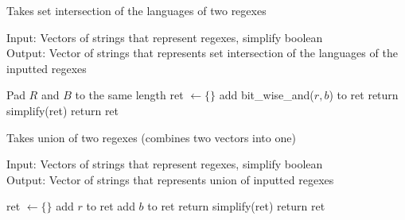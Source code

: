 \documentclass[runningheads]{llncs}
\begin{document}
\begin{algorithm}[H]
\caption{Takes set intersection of the languages of two regexes}
Input: Vectors of strings that represent regexes, simplify boolean\\
Output: Vector of strings that represents set intersection of the languages of the inputted regexes
\begin{algorithmic}

    \State Pad $R$ and $B$ to the same length
    \State ret $\leftarrow \{\}$ 
         
            \State add bit\_wise\_and($r, b$) to ret 
        \EndFor
    \EndFor
    \State return simplify(ret) 
    \Else
    \State return ret
    \EndIf
\EndProcedure

\end{algorithmic}
\end{algorithm}


\begin{algorithm}[H]
\caption{Takes union of two regexes (combines two vectors into one)}
Input: Vectors of strings that represent regexes, simplify boolean\\
Output: Vector of strings that represents union of inputted regexes
\begin{algorithmic}

    \State ret $\leftarrow \{\}$ 
        \State add $r$ to ret 
    \EndFor
        \State add $b$ to ret 
    \EndFor
    \State return simplify(ret) 
    \Else
    \State return ret
    \EndIf
\EndProcedure
\end{algorithmic}
\end{algorithm}
\end{document}
